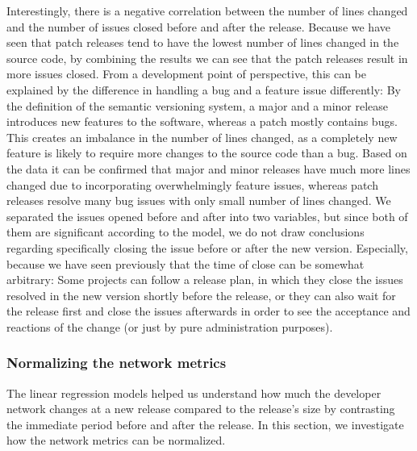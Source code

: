 Interestingly, there is a negative correlation between the number of lines changed and the number of issues closed before and after the release. Because we have seen that patch releases tend to have the lowest number of lines changed in the source code, by combining the results we can see that the patch releases result in more issues closed. From a development point of perspective, this can be explained by the difference in handling a bug and a feature issue differently: By the definition of the semantic versioning system, a major and a minor release introduces new features to the software, whereas a patch mostly contains bugs. This creates an imbalance in the number of lines changed, as a completely new feature is likely to require more changes to the source code than a bug. Based on the data it can be confirmed that major and minor releases have much more lines changed due to incorporating overwhelmingly feature issues, whereas patch releases resolve many bug issues with only small number of lines changed. We separated the issues opened before and after into two variables, but since both of them are significant according to the model, we do not draw conclusions regarding specifically closing the issue before or after the new version. Especially, because we have seen previously that the time of close can be somewhat arbitrary: Some projects can follow a release plan, in which they close the issues resolved in the new version shortly before the release, or they can also wait for the release first and close the issues afterwards in order to see the acceptance and reactions of the change (or just by pure administration purposes). 

\subsubsection{Normalizing the network metrics}

The linear regression models helped us understand how much the developer network changes at a new release compared to the release's size by contrasting the immediate period before and after the release. In this section, we investigate how the network metrics can be normalized.\\

